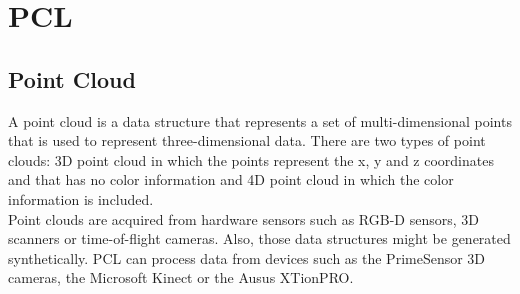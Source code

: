 \section{PCL}


\subsection{Point Cloud}
A point cloud is a data structure that represents a set of multi-dimensional points that is used to represent three-dimensional data. There are two types of point clouds: 3D point cloud in which the points represent the x, y and z coordinates and that has no color information and 4D point cloud in which the color information is included. 
\\

Point clouds are acquired from hardware sensors such as RGB-D sensors, 3D scanners or time-of-flight cameras. Also, those data structures might be generated synthetically. PCL can process data from devices such as the PrimeSensor 3D cameras, the Microsoft Kinect or the Ausus XTionPRO.



